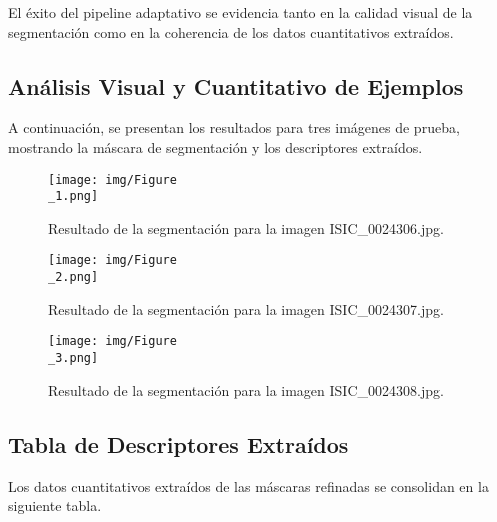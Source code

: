 \documentclass[12pt, a4paper]{article}
\begin{document}
	El éxito del pipeline adaptativo se evidencia tanto en la calidad visual de la segmentación como en la coherencia de los datos cuantitativos extraídos.
	
	\subsection{Análisis Visual y Cuantitativo de Ejemplos}
	
	A continuación, se presentan los resultados para tres imágenes de prueba, mostrando la máscara de segmentación y los descriptores extraídos.
	
	\begin{figure}[H]
		\centering
		\texttt{[image: img/Figure\\\_1.png]} 
		\caption{Resultado de la segmentación para la imagen ISIC\_0024306.jpg.}
		\label{fig:ejemplo1}
	\end{figure}
	
	\begin{figure}[H]
		\centering
		\texttt{[image: img/Figure\\\_2.png]}
		\caption{Resultado de la segmentación para la imagen ISIC\_0024307.jpg.}
		\label{fig:ejemplo2}
	\end{figure}
	
	\begin{figure}[H]
		\centering
		\texttt{[image: img/Figure\\\_3.png]}
		\caption{Resultado de la segmentación para la imagen ISIC\_0024308.jpg.}
		\label{fig:ejemplo3}
	\end{figure}
	
	\clearpage %
	
	\subsection{Tabla de Descriptores Extraídos}
	
	Los datos cuantitativos extraídos de las máscaras refinadas se consolidan en la siguiente tabla.
	
\end{document}
